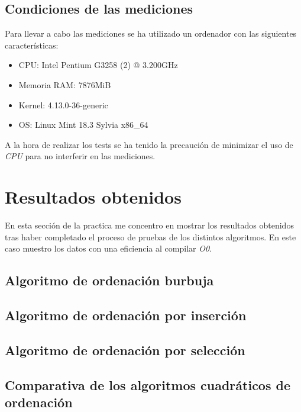 \documentclass{article}
\begin{document}
\subsection{Condiciones de las mediciones}

Para llevar a cabo las mediciones se ha utilizado un ordenador con las
siguientes características:

\begin{itemize}
\item CPU: Intel Pentium G3258 (2) @ 3.200GHz
\item Memoria RAM: 7876MiB
\item Kernel: 4.13.0-36-generic
\item OS: Linux Mint 18.3 Sylvia x86\_64
\end{itemize}

A la hora de realizar los tests se ha tenido la precaución de
minimizar el uso de \textit{CPU} para no interferir en las mediciones.

\section{Resultados obtenidos}

En esta sección de la practica me concentro en mostrar los resultados
obtenidos tras haber completado el proceso de pruebas de los distintos
algoritmos. En este caso muestro los datos con una eficiencia al
compilar \textit{O0}.

\subsection{Algoritmo de ordenación burbuja}


\subsection{Algoritmo de ordenación por inserción}




\subsection{Algoritmo de ordenación por selección}



\subsection{Comparativa de los algoritmos cuadráticos de ordenación}
\end{document}
